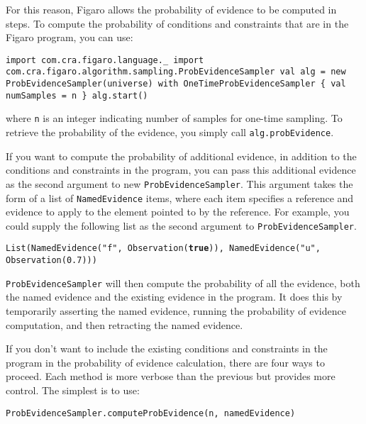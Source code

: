 For this reason, Figaro allows the probability of evidence to be computed in steps. To compute the probability of conditions and constraints that are in the Figaro program, you can use:

\begin{flushleft}
\texttt{import com.cra.figaro.language.\_
\newline \tab import com.cra.figaro.algorithm.sampling.ProbEvidenceSampler
\newline 
\newline val alg = new ProbEvidenceSampler(universe) with
\newline \tab OneTimeProbEvidenceSampler \{ val numSamples = n \}
\newline alg.start()
}
\end{flushleft}

where \texttt{n} is an integer indicating number of samples for one-time sampling. To retrieve the probability of the evidence, you simply call \texttt{alg.probEvidence}.

If you want to compute the probability of additional evidence, in addition to the conditions and constraints in the program, you can pass this additional evidence as the second argument to new \texttt{ProbEvid\-enceSampler}. This argument takes the form of a list of \texttt{NamedEvidence} items, where each item specifies a reference and evidence to apply to the element pointed to by the reference. For example, you could supply the following list as the second argument to \texttt{ProbEvidenceSampler}.

\begin{flushleft}
\texttt{List(NamedEvidence("f", Observation(\textbf{true})), 
\newline NamedEvidence("u", Observation(0.7))) }
\end{flushleft}

\texttt{ProbEvidenceSampler} will then compute the probability of all the evidence, both the named evidence and the existing evidence in the program. It does this by temporarily asserting the named evidence, running the probability of evidence computation, and then retracting the named evidence.

If you don't want to include the existing conditions and constraints in the program in the probability of evidence calculation, there are four ways to proceed. Each method is more verbose than the previous but provides more control. The simplest is to use:

\begin{flushleft}
\texttt{ProbEvidenceSampler.computeProbEvidence(n, namedEvidence)}
\end{flushleft}

